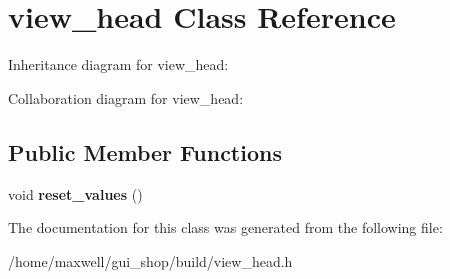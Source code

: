 \hypertarget{classview__head}{}\section{view\+\_\+head Class Reference}
\label{classview__head}


Inheritance diagram for view\+\_\+head\+:


Collaboration diagram for view\+\_\+head\+:
\subsection*{Public Member Functions}
\begin{DoxyCompactItemize}
\item 
void {\bfseries reset\+\_\+values} ()\hypertarget{classview__head_ae6439c3c99c2c4c70a7dbe1ba13a56f6}{}\label{classview__head_ae6439c3c99c2c4c70a7dbe1ba13a56f6}

\end{DoxyCompactItemize}


The documentation for this class was generated from the following file\+:\begin{DoxyCompactItemize}
\item 
/home/maxwell/gui\+\_\+shop/build/view\+\_\+head.\+h\end{DoxyCompactItemize}
